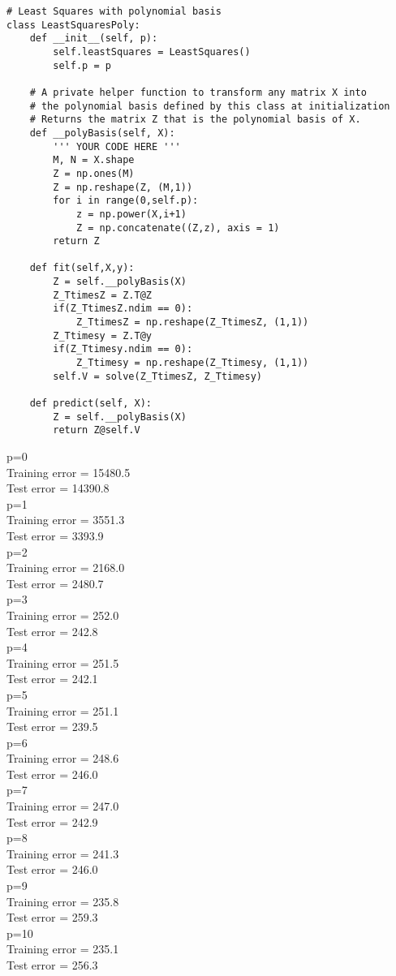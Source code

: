 \documentclass{article}
\def\red#1{{\color{red}#1}}
\begin{document}
\begin{lstlisting}
# Least Squares with polynomial basis
class LeastSquaresPoly:
    def __init__(self, p):
        self.leastSquares = LeastSquares()
        self.p = p

    # A private helper function to transform any matrix X into
    # the polynomial basis defined by this class at initialization
    # Returns the matrix Z that is the polynomial basis of X.
    def __polyBasis(self, X):
        ''' YOUR CODE HERE '''
        M, N = X.shape
        Z = np.ones(M)
        Z = np.reshape(Z, (M,1))
        for i in range(0,self.p):
            z = np.power(X,i+1)
            Z = np.concatenate((Z,z), axis = 1)
        return Z

    def fit(self,X,y):
        Z = self.__polyBasis(X)
        Z_TtimesZ = Z.T@Z
        if(Z_TtimesZ.ndim == 0):
            Z_TtimesZ = np.reshape(Z_TtimesZ, (1,1))
        Z_Ttimesy = Z.T@y
        if(Z_Ttimesy.ndim == 0):
            Z_Ttimesy = np.reshape(Z_Ttimesy, (1,1))
        self.V = solve(Z_TtimesZ, Z_Ttimesy)

    def predict(self, X):
        Z = self.__polyBasis(X)
        return Z@self.V
\end{lstlisting}
\red{
p=0 \\
Training error = 15480.5 \\
Test error     = 14390.8 \\
p=1 \\
Training error = 3551.3 \\
Test error     = 3393.9 \\
p=2 \\
Training error = 2168.0 \\
Test error     = 2480.7 \\
p=3 \\
Training error = 252.0 \\
Test error     = 242.8 \\
p=4 \\
Training error = 251.5 \\
Test error     = 242.1 \\
p=5 \\
Training error = 251.1 \\
Test error     = 239.5 \\
p=6 \\ 
Training error = 248.6 \\
Test error     = 246.0 \\
p=7 \\
Training error = 247.0 \\
Test error     = 242.9 \\
p=8 \\
Training error = 241.3 \\
Test error     = 246.0 \\
p=9 \\
Training error = 235.8 \\
Test error     = 259.3 \\
p=10 \\
Training error = 235.1 \\
Test error     = 256.3}
\end{document}
